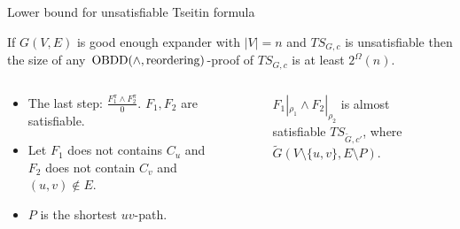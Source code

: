 \begin{frame}{Lower bound for unsatisfiable Tseitin formula}
    \begin{theorem}
    	If $G(V, E)$ is good enough expander with $|V| = n$ and $TS_{G, c}$ is unsatisfiable then the
        size of any $\mathrm{OBDD}(\land, \mathrm{reordering})$-proof of $TS_{G,c}$ is at least $2^\Omega(n)$.
    \end{theorem}

	\begin{columns}[t]
		\begin{column}{0.45\textwidth}
            \begin{itemize}
                \item The last step: $\frac{F_1^{\pi} \land F_2^{\pi}}{0}$. $F_1, F_2$ are satisfiable.
                \item Let $F_1$ does not contains $C_u$ and $F_2$ does not contain $C_v$ and $(u, v)
                    \notin E$.
                \item $P$ is the shortest $uv$-path.
            \end{itemize}    
        \end{column}
        
		\begin{column}{0.45\textwidth}
            \begin{figure}[ht]
                \begin{center}
                \end{center}
                $F_1|_{\rho_1} \land F_2|_{\rho_2}$ is almost satisfiable $TS_{\tilde G, c'}$, where
                $\tilde G(V\setminus\{u,v\},E\setminus P)$.
            \end{figure}
		\end{column}
	\end{columns}
\end{frame}

